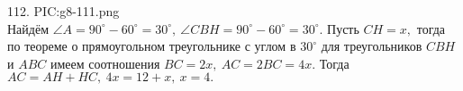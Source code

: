 112. {{PIC:g8-111.png}}\\
Найдём $\angle A=90^\circ-60^\circ=30^\circ,\ \angle CBH=90^\circ-60^\circ=30^\circ.$ Пусть $CH=x,$ тогда по теореме о прямоугольном треугольнике с углом в $30^\circ$ для треугольников $CBH$ и $ABC$ имеем соотношения $BC=2x,\ AC=2BC=4x.$ Тогда $AC=AH+HC,\ 4x=12+x,\ x=4.$\newpage\noindent
